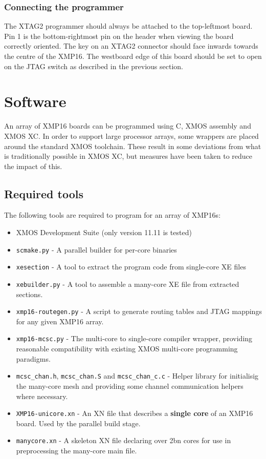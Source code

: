 \documentclass[12pt,a4paper,final,twoside]{article}
\begin{document}
\subsubsection{Connecting the programmer}

The XTAG2 programmer should always be attached to the top-leftmost board. Pin 1 is the bottom-rightmost pin on the header when viewing the board correctly oriented. The key on an XTAG2 connector should face inwards towards the centre of the XMP16. The westboard edge of this board should be set to open on the JTAG switch as described in the previous section.

\section{Software}

An array of XMP16 boards can be programmed using C, XMOS assembly and XMOS XC. In order to support large processor arrays, some wrappers are placed around the standard XMOS toolchain. These result in some deviations from what is traditionally possible in XMOS XC, but measures have been taken to reduce the impact of this.

\subsection{Required tools}

The following tools are required to program for an array of XMP16s:

\begin{itemize}
\item XMOS Development Suite (only version 11.11 is tested)
\item \texttt{scmake.py} - A parallel builder for per-core binaries
\item \texttt{xesection} - A tool to extract the program code from single-core XE files
\item \texttt{xebuilder.py} - A tool to assemble a many-core XE file from extracted sections.
\item \texttt{xmp16-routegen.py} - A script to generate routing tables and JTAG mappings for any given XMP16 array.
\item \texttt{xmp16-mcsc.py} - The multi-core to single-core compiler wrapper, providing reasonable compatibility with existing XMOS multi-core programming paradigms.
\item \texttt{mcsc\_chan.h}, \texttt{mcsc\_chan.S} and \texttt{mcsc\_chan\_c.c} - Helper library for initialisig the many-core mesh and providing some channel communication helpers where necessary.
\item \texttt{XMP16-unicore.xn} - An XN file that describes a \textbf{single core} of an XMP16 board. Used by the parallel build stage.
\item \texttt{manycore.xn} - A skeleton XN file declaring over 2bn cores for use in preprocessing the many-core main file.
\end{itemize}
\end{document}
